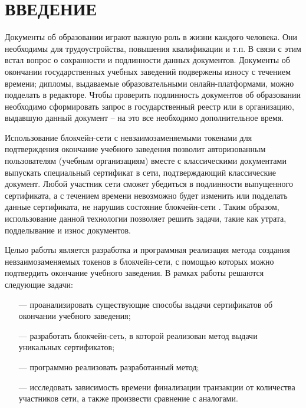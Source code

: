 \section*{ВВЕДЕНИЕ}


Документы об образовании играют важную роль в жизни каждого человека. Они необходимы для трудоустройства, повышения квалификации и т.п. В связи с этим встал вопрос о сохранности и подлинности данных документов. Документы об окончании государственных учебных заведений подвержены износу с течением времени; дипломы, выдаваемые образовательными онлайн-платформами, можно подделать в редакторе. Чтобы проверить подлинность документов об образовании необходимо сформировать запрос в государственный реестр или в организацию, выдавшую данный документ -- на это все необходимо дополнительное время.

Использование блокчейн-сети с невзаимозаменяемыми токенами для подтверждения окончание учебного заведения позволит авторизованным пользователям (учебным организациям) вместе с классическими документами выпускать специальный сертификат в сети, подтверждающий классические документ. Любой участник сети сможет убедиться в подлинности выпущенного сертификата, а с течением времени невозможно будет изменить или подделать данные сертификата, не нарушив состояние блокчейн-сети \cite{ru-bchain1}. Таким образом, использование данной технологии позволяет решить задачи, такие как утрата, подделывание и износ документов.


Целью работы является разработка и программная реализация метода создания невзаимозаменяемых токенов в блокчейн-сети, с помощью которых можно подтвердить окончание учебного заведения. В рамках работы решаются следующие задачи:
\begin{itemize}[leftmargin=1.6\parindent]
	\item[---] проанализировать существующие способы выдачи сертификатов об окончании учебного заведения;
	\item[---] разработать блокчейн-сеть, в которой реализован метод выдачи уникальных сертификатов;
	\item[---] программно реализовать разработанный метод;
	\item[---] исследовать зависимость времени финализации транзакции от количества участников сети, а также произвести сравнение с аналогами.
\end{itemize}



\pagebreak